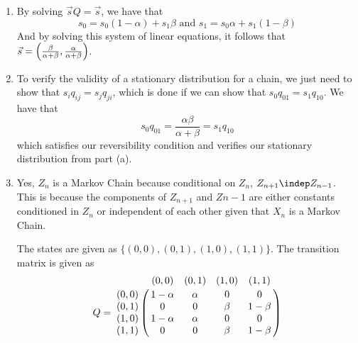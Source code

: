 \documentclass[11.5pt]{article}
\begin{document}
\begin{solution}{5}
\begin{enumerate}
\item By solving $\vec{s} Q = \vec{s}$, we have that
$$s_0 = s_0 (1 - \alpha) + s_1 \beta \textrm{ and } s_1 = s_0 \alpha + s_1 (1 - \beta)$$
And by solving this system of linear equations, it follows that $\vec{s} = \paren{\frac{\beta}{\alpha + \beta}, \frac{\alpha}{\alpha + \beta}}$.

\item To verify the validity of a stationary distribution for a chain, we just need to show that $s_i q_{ij} = s_j q_{ji}$, which is done if we can show that $s_0 q_{01} = s_1 q_{10}$. We have that
$$s_0 q_{01} = \frac{\alpha\beta}{\alpha + \beta} = s_1 q_{10}$$
which satisfies our reversibility condition and verifies our stationary distribution from part (a).

\item Yes, $Z_n$ is a Markov Chain because conditional on $Z_n$, $Z_{n+1} \indep Z_{n-1}$. This is because the components of $Z_{n+1}$ and $Z{n-1}$ are either constants conditioned in $Z_n$ or independent of each other given that $X_n$ is a Markov Chain.

The states are given as $\{ (0, 0), (0, 1), (1, 0), (1, 1) \}$. The transition matrix is given as
\[
Q = \bordermatrix{   ~   & (0, 0) & (0, 1) & (1, 0) & (1, 1) \cr
                  (0, 0) & 1-\alpha & \alpha & 0 & 0 \cr
                  (0, 1) & 0 & 0 & \beta & 1-\beta \cr
                  (1, 0) & 1-\alpha & \alpha & 0 & 0 \cr
                  (1, 1) & 0 & 0 & \beta & 1-\beta \cr
                 }
\]
\end{enumerate}
\end{solution}

\pagebreak
\end{document}
